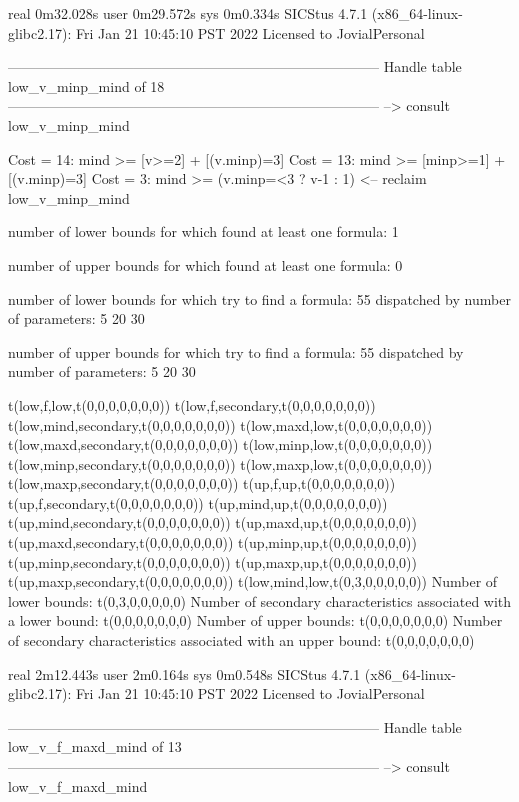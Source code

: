 real	0m32.028s
user	0m29.572s
sys	0m0.334s
SICStus 4.7.1 (x86_64-linux-glibc2.17): Fri Jan 21 10:45:10 PST 2022
Licensed to JovialPersonal


--------------------------------------------------------------------------------
Handle table low_v_minp_mind of 18
--------------------------------------------------------------------------------
--> consult low_v_minp_mind

Cost = 14:  mind >= [v>=2] + [(v.minp)=3]
Cost = 13:  mind >= [minp>=1] + [(v.minp)=3]
Cost =  3:  mind >= (v.minp=<3 ? v-1 : 1)
<-- reclaim low_v_minp_mind

number of lower bounds for which found at least one formula: 1

number of upper bounds for which found at least one formula: 0

number of lower bounds for which try to find a formula: 55
dispatched by number of parameters: 5  20  30

number of upper bounds for which try to find a formula: 55
dispatched by number of parameters: 5  20  30

t(low,f,low,t(0,0,0,0,0,0,0))
t(low,f,secondary,t(0,0,0,0,0,0,0))
t(low,mind,secondary,t(0,0,0,0,0,0,0))
t(low,maxd,low,t(0,0,0,0,0,0,0))
t(low,maxd,secondary,t(0,0,0,0,0,0,0))
t(low,minp,low,t(0,0,0,0,0,0,0))
t(low,minp,secondary,t(0,0,0,0,0,0,0))
t(low,maxp,low,t(0,0,0,0,0,0,0))
t(low,maxp,secondary,t(0,0,0,0,0,0,0))
t(up,f,up,t(0,0,0,0,0,0,0))
t(up,f,secondary,t(0,0,0,0,0,0,0))
t(up,mind,up,t(0,0,0,0,0,0,0))
t(up,mind,secondary,t(0,0,0,0,0,0,0))
t(up,maxd,up,t(0,0,0,0,0,0,0))
t(up,maxd,secondary,t(0,0,0,0,0,0,0))
t(up,minp,up,t(0,0,0,0,0,0,0))
t(up,minp,secondary,t(0,0,0,0,0,0,0))
t(up,maxp,up,t(0,0,0,0,0,0,0))
t(up,maxp,secondary,t(0,0,0,0,0,0,0))
t(low,mind,low,t(0,3,0,0,0,0,0))
Number of lower bounds:                                             t(0,3,0,0,0,0,0)
Number of secondary characteristics associated with a lower bound:  t(0,0,0,0,0,0,0)
Number of upper bounds:                                             t(0,0,0,0,0,0,0)
Number of secondary characteristics associated with an upper bound: t(0,0,0,0,0,0,0)

real	2m12.443s
user	2m0.164s
sys	0m0.548s
SICStus 4.7.1 (x86_64-linux-glibc2.17): Fri Jan 21 10:45:10 PST 2022
Licensed to JovialPersonal


--------------------------------------------------------------------------------
Handle table low_v_f_maxd_mind of 13
--------------------------------------------------------------------------------
--> consult low_v_f_maxd_mind

